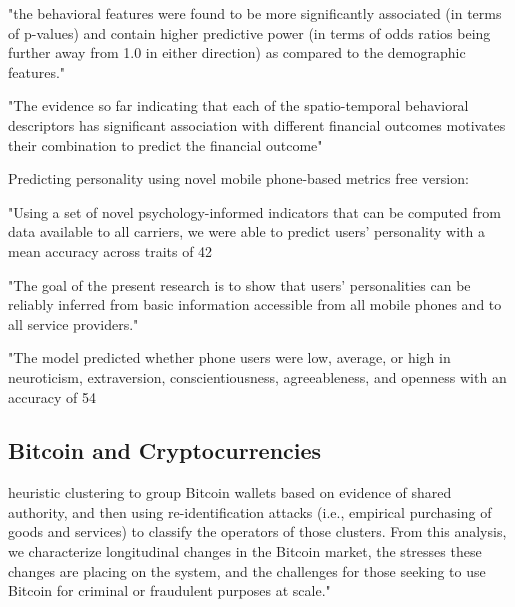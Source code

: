 {"the behavioral features were found to be more significantly associated (in terms of p-values) and contain higher predictive power (in terms of odds ratios being further away from 1.0 in either direction) as compared to the demographic features."

"The evidence so far indicating that each of the spatio-temporal behavioral descriptors has significant association with different financial outcomes motivates their combination to predict the financial outcome"




Predicting personality using novel mobile phone-based metrics
free version:

"Using a set of novel psychology-informed indicators that can be computed from data available to all carriers, we were able to predict users’ personality with a mean accuracy across traits of 42%

"The goal of the present research is to show that users’ personalities can be reliably inferred from basic information accessible from all mobile phones and to all service providers."


"The model predicted whether phone users were low, average, or high in neuroticism, extraversion, conscientiousness, agreeableness, and openness with an accuracy of 54%


\subsection{Bitcoin and Cryptocurrencies}


 heuristic clustering to group Bitcoin wallets based on evidence of shared authority, and then using re-identification attacks (i.e., empirical purchasing of goods and services) to classify the operators of those clusters. From this analysis, we characterize longitudinal changes in the Bitcoin market, the stresses these changes are placing on the system, and the challenges for those seeking to use Bitcoin for criminal or fraudulent purposes at scale." 
\cite{meiklejohn2013fistful}

}

